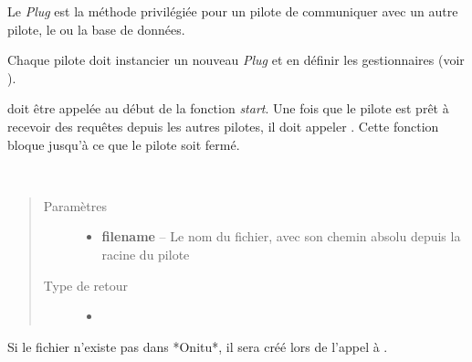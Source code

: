 \documentclass[letterpaper,10pt,english]{sphinxmanual}
\begin{document}
\begin{fulllineitems}
\label{drivers:onitu.api.Plug}
Le \emph{Plug} est la méthode privilégiée pour un pilote de communiquer avec un autre pilote, le {\hyperref[components:onitu.referee.Referee]{}} ou la base de données.

Chaque pilote doit instancier un nouveau \emph{Plug} et en définir les gestionnaires (voir {\hyperref[drivers:onitu.api.Plug.handler]{}}).

{\hyperref[drivers:onitu.api.Plug.initialize]{}} doit être appelée au début de la fonction \emph{start}. Une fois que le pilote est prêt à recevoir des requêtes depuis les autres pilotes, il doit appeler {\hyperref[components:onitu.referee.Referee.listen]{}}. Cette fonction bloque jusqu'à ce que le pilote soit fermé.

\begin{fulllineitems}
\label{drivers:onitu.api.Plug.get_metadata}~\begin{quote}\begin{description}
\item[{Paramètres}] \leavevmode\begin{itemize}
\item {} 
\textbf{filename} -- Le nom du fichier, avec son chemin absolu depuis la racine du pilote

\end{itemize}

\item[{Type de retour}] \leavevmode\begin{itemize}
\item {} 
{\hyperref[drivers:onitu.api.metadata.Metadata]{}}

\end{itemize}

\end{description}\end{quote}

Si le fichier n'existe pas dans *Onitu*, il sera créé lors de l'appel à {\hyperref[drivers:onitu.api.metadata.Metadata.write]{}}.

\end{fulllineitems}



\end{fulllineitems}
\end{document}
